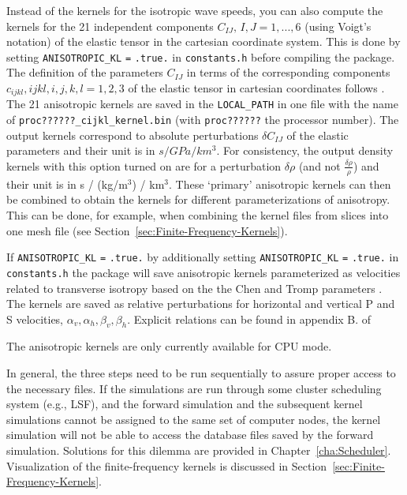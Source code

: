\begin{enumerate}
Instead of the kernels for the isotropic wave speeds, you can also
compute the kernels for the 21 independent components $C_{IJ},\, I,J=1,...,6$
(using Voigt's notation) of the elastic tensor in the cartesian coordinate
system. This is done by setting \texttt{ANISOTROPIC\_KL} \texttt{=}
\texttt{.true.} in \texttt{constants.h} before compiling the package.
The definition of the parameters $C_{IJ}$ in terms of the corresponding
components $c_{ijkl},ijkl,i,j,k,l=1,2,3$ of the elastic tensor in
cartesian coordinates follows \citet{ChTr07}. The 21 anisotropic
kernels are saved in the \texttt{LOCAL\_PATH} in one file with the
name of \texttt{proc??????\_cijkl\_kernel.bin} (with \texttt{proc??????}
the processor number). The output kernels correspond to absolute perturbations
$\delta C_{IJ}$ of the elastic parameters and their unit is in $s/GPa/km^{3}$.
For consistency, the output density kernels with this option turned
on are for a perturbation $\delta\rho$ (and not $\frac{\delta\rho}{\rho}$)
and their unit is in s / (kg/m$^{3}$) / km$^{3}$. These `primary'
anisotropic kernels can then be combined to obtain the kernels for
different parameterizations of anisotropy. This can be done, for example,
when combining the kernel files from slices into one mesh file (see
Section~\ref{sec:Finite-Frequency-Kernels}).


If \texttt{ANISOTROPIC\_KL} \texttt{=} \texttt{.true.} by additionally
setting \texttt{ANISOTROPIC\_KL} \texttt{=} \texttt{.true.} in \texttt{constants.h}
the package will save anisotropic kernels parameterized as velocities
related to transverse isotropy based on the the Chen and Tromp parameters
\citet{ChTr07}. The kernels are saved as relative perturbations for
horizontal and vertical P and S velocities, $\alpha_{v},\alpha_{h},\beta_{v},\beta_{h}$.
Explicit relations can be found in appendix B. of \citet{SiLiTrTr07b}


The anisotropic kernels are only currently available for CPU mode.

\end{enumerate}
In general, the three steps need to be run sequentially to assure
proper access to the necessary files. If the simulations are run through
some cluster scheduling system (e.g., LSF), and the forward simulation
and the subsequent kernel simulations cannot be assigned to the same
set of computer nodes, the kernel simulation will not be able to access
the database files saved by the forward simulation. Solutions for
this dilemma are provided in Chapter~\ref{cha:Scheduler}. Visualization
of the finite-frequency kernels is discussed in Section~\ref{sec:Finite-Frequency-Kernels}.

